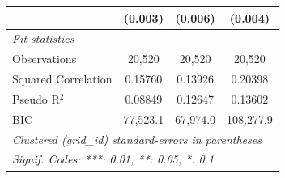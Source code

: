 \begin{tabular}{lccc}
                       & (0.003)        & (0.006)        & (0.004)\\   
   \midrule
   \emph{Fit statistics}\\
   Observations        & 20,520         & 20,520         & 20,520\\  
   Squared Correlation & 0.15760        & 0.13926        & 0.20398\\  
   Pseudo R$^2$        & 0.08849        & 0.12647        & 0.13602\\  
   BIC                 & 77,523.1       & 67,974.0       & 108,277.9\\  
   \midrule \midrule
   \multicolumn{4}{l}{\emph{Clustered (grid\_id) standard-errors in parentheses}}\\
   \multicolumn{4}{l}{\emph{Signif. Codes: ***: 0.01, **: 0.05, *: 0.1}}\\
\end{tabular}
\par\endgroup


